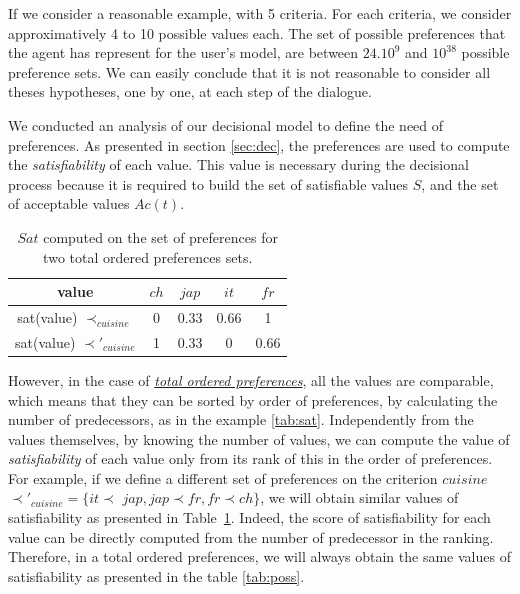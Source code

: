 \documentclass[conference, letterpaper]{IEEEtran}
\begin{document}
		If we consider a reasonable example, with 5 criteria. For each criteria, we consider approximatively 4 to 10 possible values each. The set of possible preferences that the agent has represent for the user's model, are between $24.10^9$ and $10^{38}$ possible preference sets. 
		We can easily conclude that it is not reasonable to consider all theses hypotheses, one by one, at each step of the dialogue.
	

		We conducted an analysis of our decisional model to define the need of preferences. As presented in section \ref{sec:dec}, the preferences are used to compute the \emph{satisfiability} of each value. %
		 This value is necessary during the decisional process because it is required to build the set of satisfiable values $S$, and the set of acceptable values $Ac(t)$.   
		 
		 	\begin{table} [h]
		 		\centering
		 		\large
		 		\caption{$Sat$ computed on the set of preferences for two total ordered preferences sets.}
		 		\begin{tabular}{ |c|c|c|c|c| }
		 			\hline
		 			value & $ch$ & $jap$ & $it$ & $fr$ \\	
		 			\hline
		 			sat(value) $\prec_{cuisine}$ & 0 & 0.33 & 0.66 & 1 \\
		 			\hline
		 			sat(value) $\prec'_{cuisine}$ & 1 & 0.33 & 0 & 0.66 \\
		 			\hline
		 		\end{tabular}

		 		\label{tab:ex2_sat}
		 		
		 	\end{table}
	
		However, in the case of \underline{\textit{total ordered preferences}}, all the values are comparable, which means that they can be sorted by order of preferences, by calculating the number of predecessors, as in the example \ref{tab:sat}. Independently from the values themselves, by knowing the number of values, we can compute the value of \emph{satisfiability} of each value only from its rank of this in the order of preferences. For example, if we define a different set of preferences  on the criterion $cuisine$ $\prec'_{cuisine} = \{it$$\prec$ $jap, jap$$\prec$$ fr, fr$$\prec$$ch\}$, we will obtain similar values of satisfiability as presented in Table~\ref{tab:ex2_sat}. Indeed, the score of satisfiability for each value can be directly computed from the number of predecessor in the ranking. Therefore, in a total ordered preferences, we will always obtain the same values of satisfiability as presented in the table \ref{tab:poss}. 
\end{document}
